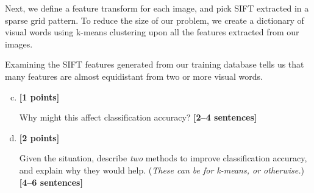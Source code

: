 \pagebreak
Next, we define a feature transform for each image, and pick SIFT extracted in a sparse grid pattern. To reduce the size of our problem, we create a dictionary of visual words using k-means clustering upon all the features extracted from our images.

Examining the SIFT features generated from our training database tells us that many features are almost equidistant from two or more visual words.

\begin{enumerate}[(a)]
    \setcounter{enumi}{2}
    \item \textbf{[1 points]}
    \begin{tcolorbox}[colback=orange!5!white,colframe=orange!75!black]
      Why might this affect classification accuracy? \textbf{[2--4 sentences]}
    \end{tcolorbox}
    
    

    \item \textbf{[2 points]} 
    \begin{tcolorbox}[colback=orange!5!white,colframe=orange!75!black]
     Given the situation, describe \emph{two} methods to improve classification accuracy, and explain why they would help. (\emph{These can be for k-means, or otherwise.}) \textbf{[4--6 sentences]}
    \end{tcolorbox}
    
    


\end{enumerate}
